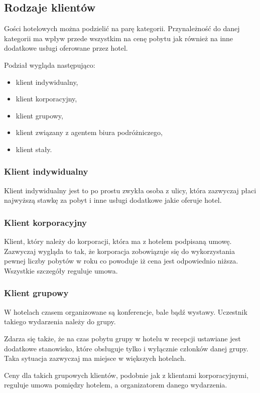 \documentclass[12pt, a4paper]{article}
\begin{document}
\subsection{Rodzaje klientów}
\label{rodzaje_klientow}
Gości hotelowych można podzielić na parę kategorii. Przynależność do danej
kategorii ma wpływ przede wszystkim na cenę pobytu jak również na inne 
dodatkowe usługi oferowane przez hotel. 

Podział wygląda następująco:
\begin{itemize}
  \item klient indywidualny,
  \item klient korporacyjny,
  \item klient grupowy,
  \item klient związany z agentem biura podróżniczego,
  \item klient stały.
\end{itemize}

\subsubsection{Klient indywidualny}
Klient indywidualny jest to po prostu zwykła osoba z ulicy, która zazwyczaj
płaci najwyższą stawkę za pobyt i inne usługi dodatkowe jakie oferuje hotel.

\subsubsection{Klient korporacyjny}
Klient, który należy do korporacji, która ma z hotelem podpisaną umowę.
Zazwyczaj wygląda to tak, że korporacja zobowiązuje się do wykorzystania 
pewnej liczby pobytów w roku co powoduje iż cena jest odpowiednio niższa.
Wszystkie szczegóły reguluje umowa.

\subsubsection{Klient grupowy}
W hotelach czasem organizowane są konferencje, bale bądź wystawy. Uczestnik
takiego wydarzenia należy do grupy.

Zdarza się także, że na czas pobytu grupy w hotelu w recepcji ustawiane 
jest dodatkowe stanowisko, które obsługuje tylko i wyłącznie członków danej 
grupy. Taka sytuacja zazwyczaj ma miejsce w większych hotelach.

Ceny dla takich grupowych klientów, podobnie jak z klientami korporacyjnymi,
reguluje umowa pomiędzy hotelem, a organizatorem danego wydarzenia.
\end{document}

